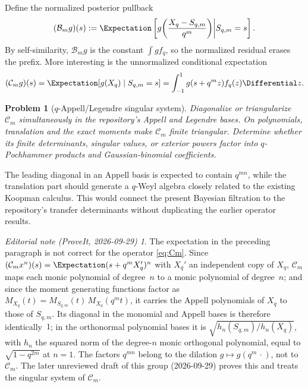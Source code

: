 \documentclass[11pt,oneside]{article}
\newtheorem{problem}[theorem]{Problem}
\theoremstyle{definition}
\theoremstyle{remark}
\newtheorem*{ednote}{Editorial note (ProveIt, 2026-09-29)}
\begin{document}
Define the normalized posterior pullback
\begin{equation}
 (\mathcal B_mg)(s)
 :=\Expectation\left[g\!\left(\frac{X_q-S_{q,m}}{q^m}\right)
       \middle|S_{q,m}=s\right].
 \label{eq:Bayesian-operator}
\end{equation}
By self-similarity, $\mathcal B_mg$ is the constant $\int g f_q$, so the
normalized residual erases the prefix.  More interesting is the unnormalized
conditional expectation
\begin{equation}
 (\mathcal C_mg)(s)=\Expectation[g(X_q)\mid S_{q,m}=s]
 =\int_{-1}^{1}g(s+q^mz)f_q(z)\Differential z.
 \label{eq:Cm}
\end{equation}

\begin{problem}[$q$-Appell/Legendre singular system]
\label{prob:Bayesian-spectrum}
Diagonalize or triangularize $\mathcal C_m$ simultaneously in the repository's
Appell and Legendre bases.  On polynomials, translation and the exact moments make
$\mathcal C_m$ finite triangular.  Determine whether its finite determinants,
singular values, or exterior powers factor into $q$-Pochhammer products and
Gaussian-binomial coefficients.
\end{problem}

The leading diagonal in an Appell basis is expected to contain $q^{mn}$, while the
translation part should generate a $q$-Weyl algebra closely related to the
existing Koopman calculus.  This would connect the present Bayesian filtration to
the repository's transfer determinants without duplicating the earlier operator
results.
\begin{ednote}
The expectation in the preceding paragraph is not correct for the
operator \eqref{eq:Cm}.  Since $(\mathcal C_mx^n)(s)=\Expectation(s+q^mX_q')^n$
with $X_q'$ an independent copy of $X_q$, $\mathcal C_m$ maps each monic
polynomial of degree~$n$ to a monic polynomial of degree~$n$; and since the
moment generating functions factor as $M_{X_q}(t)=M_{S_{q,m}}(t)\,M_{X_q}(q^mt)$,
it carries the Appell polynomials of $X_q$ to those of $S_{q,m}$.  Its
diagonal in the monomial and Appell bases is therefore identically~$1$; in
the orthonormal polynomial bases it is $\sqrt{h_n(S_{q,m})/h_n(X_q)}$, with
$h_n$ the squared norm of the degree-$n$ monic orthogonal polynomial, equal
to $\sqrt{1-q^{2m}}$ at $n=1$.  The factors $q^{mn}$ belong to the dilation
$g\mapsto g(q^m\,\cdot)$, not to $\mathcal C_m$.  The later unreviewed draft
 of this group
(2026-09-29) proves this and treats the singular system of $\mathcal C_m$.
\end{ednote}
\end{document}
